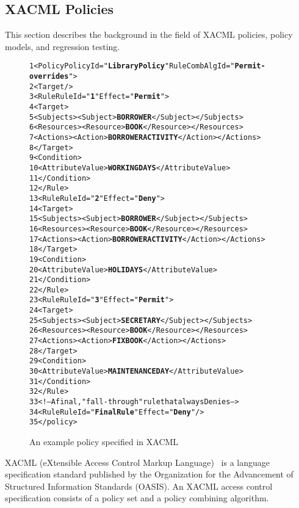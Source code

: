 \subsection{XACML Policies}
This section describes the background in the field of XACML policies, policy models, and regression testing.
\begin{figure}[t]%
\begin{CodeOut}
\begin{alltt}
 1 <Policy PolicyId="\textbf{Library Policy}" RuleCombAlgId="\textbf{Permit-overrides}">
 2  <Target/>
 3    <Rule RuleId="\textbf{1}" Effect="\textbf{Permit}">
 4      <Target>
 5        <Subjects><Subject> \textbf{BORROWER} </Subject></Subjects>
 6        <Resources><Resource> \textbf{BOOK} </Resource></Resources>
 7        <Actions><Action> \textbf{BORROWERACTIVITY} </Action></Actions>
 8      </Target>
 9	    <Condition>
10        <AttributeValue> \textbf{WORKINGDAYS} </AttributeValue>
11      </Condition>
12    </Rule>
13    <Rule RuleId="\textbf{2}" Effect="\textbf{Deny}">
14      <Target>
15        <Subjects><Subject> \textbf{BORROWER} </Subject></Subjects>
16        <Resources><Resource> \textbf{BOOK} </Resource></Resources>
17        <Actions><Action> \textbf{BORROWERACTIVITY} </Action></Actions>
18      </Target>
19	    <Condition>
20        <AttributeValue> \textbf{HOLIDAYS} </AttributeValue>
21      </Condition>
22    </Rule>
23    <Rule RuleId="\textbf{3}" Effect="\textbf{Permit}">
24      <Target>
25        <Subjects><Subject> \textbf{SECRETARY} </Subject></Subjects>
26        <Resources><Resource> \textbf{BOOK} </Resource></Resources>
27        <Actions><Action> \textbf{FIXBOOK} </Action></Actions>
28      </Target>
29	    <Condition>
30        <AttributeValue> \textbf{MAINTENANCEDAY} </AttributeValue>
31      </Condition>
32    </Rule>
33      <!-- A final, "fall-through" rule that always Denies -->
34    <Rule RuleId="\textbf{FinalRule}" Effect="\textbf{Deny}"/>
35 </policy>
\end{alltt}
\end{CodeOut}
\vspace*{-3.0ex} \caption{An example policy specified in XACML}
 \label{fig:example}
\end{figure}
XACML (eXtensible Access Control Markup Language)~\cite{oasis05:xacml} is a language specification standard
published by the Organization for the Advancement of Structured Information Standards (OASIS).
An XACML access control specification consists of a policy set and a policy combining algorithm.
